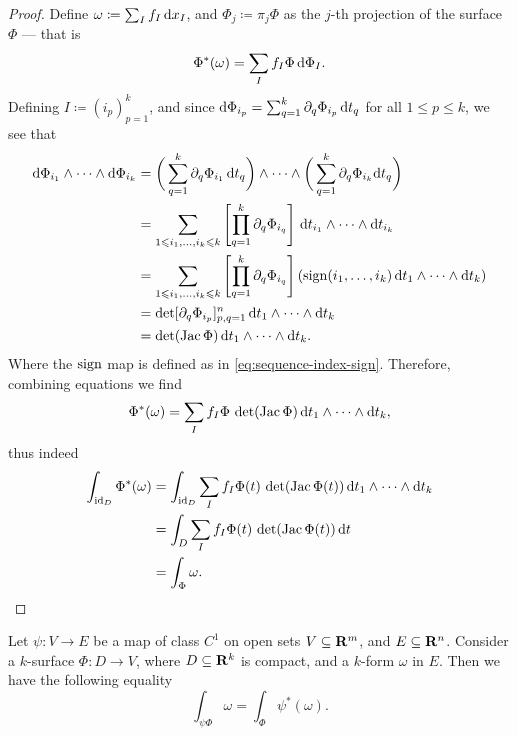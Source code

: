 \begin{proof}
    Define \(\omega \coloneq \sum_I f_I\, \mathrm{d} x_I\), and \(\Phi_j \coloneq \pi_j
    \Phi\) as the \(j\)-th projection of the surface \(\Phi\) --- that is
    \[
        \Phi^{*}(\omega) = \sum_I f_I \Phi\, \mathrm{d} \Phi_I.
    \]
    Defining \(I \coloneq (i_p)_{p=1}^k\), and since \(\mathrm{d} \Phi_{i_p} =
    \sum_{q=1}^k \partial_q \Phi_{i_p}\, \mathrm{d} t_{q}\) for all \(1 \leq p \leq k\),
    we see that
    \begin{align*}
        \mathrm{d} \Phi_{i_1} \wedge \dots \wedge \mathrm{d} \Phi_{i_k}
         & = \bigg( \sum_{q=1}^k \partial_q \Phi_{i_1}\, \mathrm{d} t_{q} \bigg)
        \wedge \dots \wedge \bigg( \sum_{q=1}^k \partial_q \Phi_{i_k} \mathrm{d} t_q \bigg)
        \\
         & = \sum_{1 \leqslant i_1, \dots, i_k \leqslant k} \left[
            \prod_{q=1}^k \partial_q \Phi_{i_q}
        \right]\, \mathrm{d} t_{i_1} \wedge \dots \wedge \mathrm{d} t_{i_k}           \\
         & = \sum_{1 \leqslant i_1, \dots, i_k \leqslant k} \left[
            \prod_{q=1}^k \partial_q \Phi_{i_q}
            \right] \left(
        \operatorname{sign}(i_1, \dots, i_k)\, \mathrm{d} t_{1} \wedge \dots \wedge \mathrm{d} t_{k}
        \right)                                                             \\
         & = \det [\partial_q \Phi_{i_p}]_{p, q = 1}^{n}\,
        \mathrm{d} t_1 \wedge \dots \wedge \mathrm{d} t_k                             \\
         & = \det(\operatorname{Jac} \Phi)\, \mathrm{d} t_1 \wedge \dots \wedge \mathrm{d} t_k.
    \end{align*}
    Where the \(\operatorname{sign}\) map is defined as in
    \cref{eq:sequence-index-sign}. Therefore, combining equations we find
    \[
        \Phi^{*}(\omega) = \sum_I f_I \Phi\, \det(\operatorname{Jac} \Phi)\,
        \mathrm{d} t_1 \wedge \dots \wedge \mathrm{d} t_k,
    \]
    thus indeed
    \begin{align*}
        \int_{\operatorname{id}_D} \Phi^{*}(\omega)
         & = \int_{\operatorname{id}_D} \sum_I
        f_I \Phi(t)\, \det(\operatorname{Jac} \Phi(t))\, \mathrm{d} t_1 \wedge \dots \wedge \mathrm{d} t_k
        \\
         & = \int_D \sum_I f_I \Phi(t)\, \det(\operatorname{Jac} \Phi(t))\, \mathrm{d} t \\
         & = \int_{\Phi} \omega.
    \end{align*}
\end{proof}

\begin{theorem}
    \label{thm:change-of-variable-integral-over-surface-forms}
    Let \(\psi: V \to E\) be a map of class \(C^1\) on open sets \(V \subseteq
    \mathbf{R}^m\), and \(E \subseteq \mathbf{R}^n\). Consider a \(k\)-surface \(\Phi: D \to V\),
    where \(D \subseteq \mathbf{R}^k\) is compact, and a \(k\)-form \(\omega\) in
    \(E\). Then we have the following equality
    \[
        \int_{\psi \Phi} \omega = \int_{\Phi} \psi^{*}(\omega).
    \]
\end{theorem}

